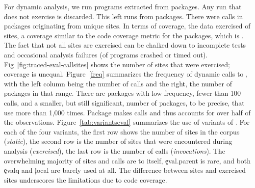 \documentclass[review,screen,acmsmall,anonymous=true]{acmart}
\begin{document}
For dynamic analysis, we run \CranRunnableScripts programs extracted from
\CranPackages packages. Any run that does not exercise \eval is discarded. This
left \packageNbruns runs from \packageCorpus packages. There were
\packageAllcalls calls in \packageTriggeredpkgs packages originating from
\PkgHitEvalCallSites unique sites. In terms of coverage, the data exercised
\PkgHitEvalCallSitesAvgRatio of sites, a coverage similar to the code coverage
metric for the packages, which is \PkgCodeCoverage. The fact that not all sites
are exercised can be chalked down to incomplete tests and occasional analysis
failures (\PkgFailedProgramsRatio of programs crashed or timed out).
Fig~\ref{fig:traced-eval-callsites} shows the number of sites that were
exercised; coverage is unequal. Figure~\ref{freq} summarizes the frequency of
dynamic calls to \eval, with the left column being the number of calls and the
right, the number of packages in that range. There are \packageFewcalls packages
with low \eval frequency, fewer than 100 calls, and a smaller, but still
significant, number of packages, \packageManycalls to be precise, that use \eval
more than 1,000 times. Package \packageMaxcallspack makes \packageMaxcalls calls
and thus accounts for over half of the observations.
Figure~\ref{tab:variantseval} summarizes the use of variants of \eval. For each
of the four variants, the first row shows the number of sites in the corpus
(\emph{static}), the second row is the number of sites that were encountered
during analysis (\emph{exercised}), the last row is the number of calls
(\emph{invocations}). The overwhelming majority of sites and calls are to \eval
itself, \c{eval.parent} is rare, and both \c{evalq} and \c{local} are barely
used at all. The difference between sites and exercised sites underscores the
limitations due to code coverage.
\end{document}
